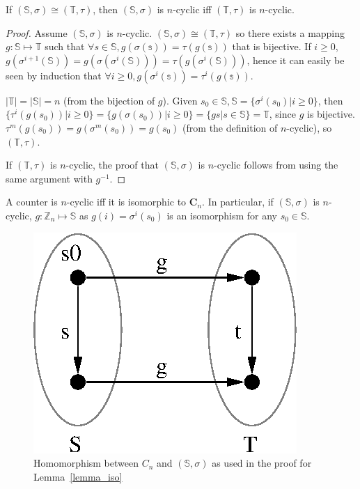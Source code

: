 \documentclass[5p, twocolumn]{elsarticle}
\begin{document}
\begin{lemma}
If $(\mathbb{S},\sigma)\cong(\mathbb{T},\tau)$, then $(\mathbb{S},\sigma)$ is $n$-cyclic iff $(\mathbb{T},\tau)$ is $n$-cyclic.
\label{iso_cyclic}
\end{lemma}

\begin{proof}
Assume $(\mathbb{S},\sigma)$ is $n$-cyclic. $(\mathbb{S},\sigma)\cong(\mathbb{T},\tau)$ so there exists a mapping $g:\mathbb{S}\mapsto\mathbb{T}$ such that $\forall s\in\mathbb{S},g(\sigma(\mathbb{s}))=\tau(g(\mathbb{s}))$ that is bijective. If $i\geq0$, $g(\sigma^{i+1}(\mathbb{S}))=g(\sigma(\sigma^i(\mathbb{S})))=\tau(g(\sigma^i(\mathbb{S})))$, hence it can easily be seen by induction that  $\forall i\geq0,g(\sigma^i(\mathbb{s}))=\tau^i(g(\mathbb{s}))$.

$|\mathbb{T}|=|\mathbb{S}|=n$ (from the bijection of $g$). Given $s_0\in\mathbb{S}, \mathbb{S}=\{\sigma^i(s_0)|i\geq 0\}$, then $\{\tau^i(g(s_0))|i\geq 0\}=\{g(\sigma(s_0))|i\geq 0\}=\{g{s}|s\in\mathbb{S}\}=\mathbb{T}$, since $g$ is bijective. $\tau^m(g(s_0))=g(\sigma^m(s_0))=g(s_0)$ (from the definition of $n$-cyclic), so $(\mathbb{T},\tau)$.

If $(\mathbb{T},\tau)$ is $n$-cyclic, the proof that $(\mathbb{S},\sigma)$ is $n$-cyclic follows from using the same argument with $g^{-1}$.
\end{proof}

\begin{lemma}
A counter is $n$-cyclic iff it is isomorphic to $\mathbf{C}_n$. In particular, if $(\mathbb{S},\sigma)$ is $n$-cyclic, $g:\mathbb{Z}_n\mapsto\mathbb{S}$ as $g(i)=\sigma^i(s_0)$ is an isomorphism for any $s_0\in\mathbb{S}$.
\label{lemma_iso}
\end{lemma}

\begin{figure}
\begin{center}
\includegraphics[width=0.5\linewidth]{images/isomorphism.eps}
\caption{Homomorphism between $C_n$ and $(\mathbb{S},\sigma)$ as used in the proof for Lemma~\ref{lemma_iso}}
\label{homomorphism}
\end{center}
\end{figure}
\end{document}
